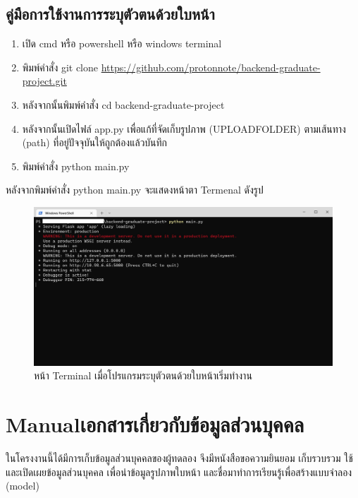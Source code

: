 \section{คู่มือการใช้งานการระบุตัวตนด้วยใบหน้า}
\begin{enumerate}
  \item เปิด cmd หรือ powershell หรือ windows terminal
  \item พิมพ์คำสั่ง git clone \url{https://github.com/protonnote/backend-graduate-project.git}
  \item หลังจากนั้นพิมพ์คำสั่ง cd backend-graduate-project
  \item หลังจากนั้นเปิดไฟล์ app.py เพื่อแก้ที่จัดเก็บรูปภาพ (UPLOAD\textunderscore FOLDER) ตามเส้นทาง (path) ที่อยู่ปัจจุบันให้ถูกต้องแล้วบันทึก
  \item พิมพ์คำสั่ง python main.py
\end{enumerate}

หลังจากพิมพ์คำสั่ง python main.py จะแสดงหน้าตา Termenal ดังรูป
\begin{figure}[!ht]
  \begin{center}
    \includegraphics[scale=.4]{pic/server_start.png}
    \caption[หน้า Terminal เมื่อโปรแกรมระบุตัวตนด้วยใบหน้าเริ่มทำงาน]{หน้า Terminal เมื่อโปรแกรมระบุตัวตนด้วยใบหน้าเริ่มทำงาน}
    \label{fig:server_start}
  \end{center}
\end{figure}


\chapter{\ifenglish Manual\else เอกสารเกี่ยวกับข้อมูลส่วนบุคคล\fi}
ในโครงงานนี้ได้มีการเก็บข้อมูลส่วนบุคคลของผู้ทดลอง จึงมีหนังสือขอความยินยอม เก็บรวบรวม ใช้ และเปิดเผยข้อมูลส่วนบุคคล เพื่อนำข้อมูลรูปภาพใบหน้า 
และชื่อมาทำการเรียนรู้เพื่อสร้างแบบจำลอง (model)

